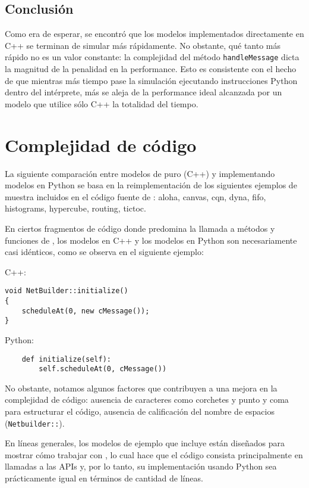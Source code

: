 \subsection{Conclusión}

Como era de esperar, se encontró que los modelos implementados directamente en
C++ se terminan de simular más rápidamente. No obstante, qué tanto más rápido
no es un valor constante: la complejidad del método \verb!handleMessage! dicta
la magnitud de la penalidad en la performance. Esto es consistente con el hecho
de que mientras más tiempo pase la simulación ejecutando instrucciones Python
dentro del intérprete, más se aleja de la performance ideal alcanzada por un
modelo que utilice sólo C++ la totalidad del tiempo.

\section{Complejidad de código}

La siguiente comparación entre modelos de \omnetpp{} puro (C++) y \omnetpp{}
implementando modelos en Python se basa en la reimplementación de los
siguientes ejemplos de muestra incluidos en el código fuente de \omnetpp{}: aloha,
canvas, cqn, dyna, fifo, histograms, hypercube, routing, tictoc.

En ciertos fragmentos de código donde predomina la llamada a métodos y
funciones de \omnetpp{}, los modelos en C++ y los modelos en Python son
necesariamente casi idénticos, como se observa en el siguiente ejemplo:

\noindent C++:

\begin{verbatim}
void NetBuilder::initialize()
{
    scheduleAt(0, new cMessage());
}
\end{verbatim}

\noindent Python:

\begin{verbatim}
    def initialize(self):
        self.scheduleAt(0, cMessage())
\end{verbatim}

No obstante, notamos algunos factores que contribuyen a una mejora en la
complejidad de código: ausencia de caracteres como corchetes y punto y coma
para estructurar el código, ausencia de calificación del nombre de espacios
(\verb!Netbuilder::!).

En líneas generales, los modelos de ejemplo que incluye \omnetpp{} están diseñados
para mostrar cómo trabajar con \omnetpp{}, lo cual hace que el código consista
principalmente en llamadas a las APIs y, por lo tanto, su implementación usando
Python sea prácticamente igual en términos de cantidad de líneas.

